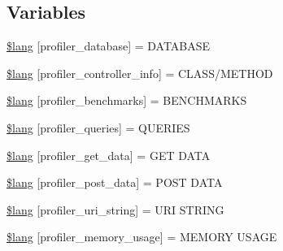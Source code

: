 \subsection*{Variables}
\begin{DoxyCompactItemize}
\item 
\hyperlink{system_2language_2english_2profiler__lang_8php_a93beea1bc75788ad2b7d3d3895984282}{\$lang} \mbox{[}\textquotesingle{}profiler\+\_\+database\textquotesingle{}\mbox{]} = \textquotesingle{}D\+A\+T\+A\+B\+A\+S\+E\textquotesingle{}
\item 
\hyperlink{system_2language_2english_2profiler__lang_8php_a13e794a194b3fae4ac89472fa90a39a4}{\$lang} \mbox{[}\textquotesingle{}profiler\+\_\+controller\+\_\+info\textquotesingle{}\mbox{]} = \textquotesingle{}C\+L\+A\+S\+S/M\+E\+T\+H\+O\+D\textquotesingle{}
\item 
\hyperlink{system_2language_2english_2profiler__lang_8php_a542e9f6b34cf149d1574a8f6b2c9568d}{\$lang} \mbox{[}\textquotesingle{}profiler\+\_\+benchmarks\textquotesingle{}\mbox{]} = \textquotesingle{}B\+E\+N\+C\+H\+M\+A\+R\+K\+S\textquotesingle{}
\item 
\hyperlink{system_2language_2english_2profiler__lang_8php_ac8efd051248fb102a6cc0c9b418ffd6d}{\$lang} \mbox{[}\textquotesingle{}profiler\+\_\+queries\textquotesingle{}\mbox{]} = \textquotesingle{}Q\+U\+E\+R\+I\+E\+S\textquotesingle{}
\item 
\hyperlink{system_2language_2english_2profiler__lang_8php_aed0d74a29b2ef17977baa94091d06058}{\$lang} \mbox{[}\textquotesingle{}profiler\+\_\+get\+\_\+data\textquotesingle{}\mbox{]} = \textquotesingle{}G\+E\+T D\+A\+T\+A\textquotesingle{}
\item 
\hyperlink{system_2language_2english_2profiler__lang_8php_a6b2928f829db3649049332dc4468018d}{\$lang} \mbox{[}\textquotesingle{}profiler\+\_\+post\+\_\+data\textquotesingle{}\mbox{]} = \textquotesingle{}P\+O\+S\+T D\+A\+T\+A\textquotesingle{}
\item 
\hyperlink{system_2language_2english_2profiler__lang_8php_a1f1644f4e586555cb83f718552502136}{\$lang} \mbox{[}\textquotesingle{}profiler\+\_\+uri\+\_\+string\textquotesingle{}\mbox{]} = \textquotesingle{}U\+R\+I S\+T\+R\+I\+N\+G\textquotesingle{}
\item 
\hyperlink{system_2language_2english_2profiler__lang_8php_aaffc8cc3dd25f21388a6edb5fbfc8859}{\$lang} \mbox{[}\textquotesingle{}profiler\+\_\+memory\+\_\+usage\textquotesingle{}\mbox{]} = \textquotesingle{}M\+E\+M\+O\+R\+Y U\+S\+A\+G\+E\textquotesingle{}
\item 

\end{DoxyCompactItemize}
